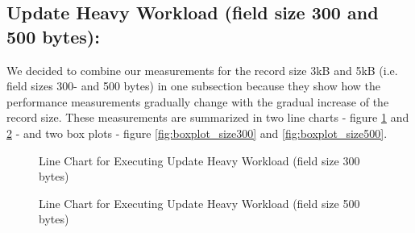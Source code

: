 \documentclass[letterpaper, 10 pt, conference]{ieeeconf}  %
\begin{document}
\subsection{Update Heavy Workload (field size 300 and 500 bytes):}
We decided to combine our measurements for the record size 3kB and 5kB (i.e. field sizes 300- and 500 bytes) in one subsection because they show how the performance measurements gradually change with the gradual increase of the record size. These measurements are summarized in two line charts - figure \ref{fig:workloadA_size300} and \ref{fig:workloadA_size500} - and two box plots - figure \ref{fig:boxplot_size300} and \ref{fig:boxplot_size500}.


\begin{figure}[h]
\centering
{}
\caption{Line Chart for Executing Update Heavy Workload (field size 300 bytes)}
\label{fig:workloadA_size300}
\end{figure}  
 
\begin{figure}[h]
\centering
{}
\caption{Line Chart for Executing Update Heavy Workload (field size 500 bytes)}
\label{fig:workloadA_size500}
\end{figure}  
\end{document}
